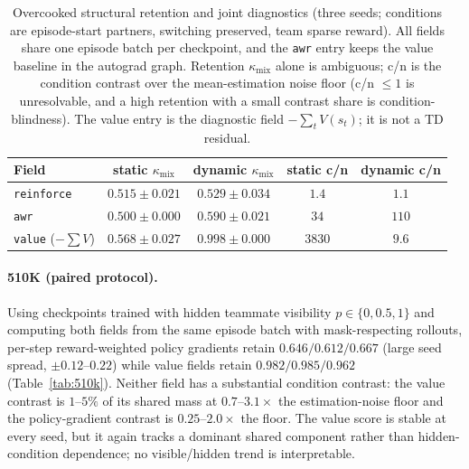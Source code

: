 \documentclass{article}
\newcommand{\kmix}{\kappa_{\mathrm{mix}}}
\begin{document}
\begin{table}[t]
\caption{Overcooked structural retention and joint diagnostics (three
seeds; conditions are episode-start partners, switching preserved, team
sparse reward). All fields share one episode batch per checkpoint, and the
\texttt{awr} entry keeps the value baseline in the autograd graph. Retention
$\kmix$ alone is ambiguous; c/n is the condition contrast over the
mean-estimation noise floor (c/n $\le 1$ is unresolvable, and a high
retention with a small contrast share is condition-blindness). The value
entry is the diagnostic field
$-\sum_t V(s_t)$; it is not a TD residual.}
\label{tab:overcooked}
\begin{center}
\begin{tabular}{lcccc}
\toprule
Field & static $\kmix$ & dynamic $\kmix$ & static c/n & dynamic c/n \\
\midrule
\texttt{reinforce} & $0.515\pm0.021$ & $0.529\pm0.034$ & $1.4$ & $1.1$ \\
\texttt{awr} & $0.500\pm0.000$ & $0.590\pm0.021$ & $34$ & $110$ \\
\texttt{value} ($-\sum V$) & $0.568\pm0.027$ & $0.998\pm0.000$ & $3830$ & $9.6$ \\
\bottomrule
\end{tabular}
\end{center}
\end{table}

\paragraph{510K (paired protocol).}
Using checkpoints trained with hidden teammate visibility
$p\in\{0,0.5,1\}$ and computing both fields from the same episode batch with
mask-respecting rollouts, per-step reward-weighted policy gradients retain
$0.646/0.612/0.667$ (large seed spread, $\pm0.12$--$0.22$) while value fields
retain $0.982/0.985/0.962$ (Table~\ref{tab:510k}). Neither field has a
substantial condition contrast: the value contrast is $1$--$5\%$ of its shared
mass at $0.7$--$3.1\times$ the estimation-noise floor and the policy-gradient
contrast is $0.25$--$2.0\times$ the floor. The value score is stable at
every seed, but it again tracks a dominant shared component rather than
hidden-condition dependence; no visible/hidden trend is interpretable.
\end{document}
